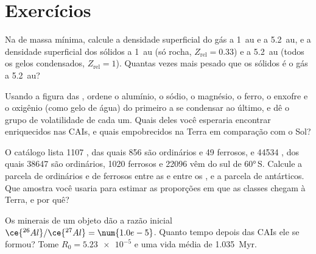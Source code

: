 \section{Exercícios}

\begin{exercise}[$\star$]\label{exo:b2:planet-formation-meteorites:1}
Na  de massa mínima, calcule a densidade superficial do gás a
\qty{1}{au} e a \qty{5.2}{au}, e a densidade superficial dos sólidos a
\qty{1}{au} (só rocha, $Z_{\mathrm{rel}} = 0.33$) e a \qty{5.2}{au} (todos os gelos
condensados, $Z_{\mathrm{rel}} = 1$). Quantas vezes mais pesado que os sólidos é o
gás a \qty{5.2}{au}?
\end{exercise}

\begin{exercise}[$\star$]\label{exo:b2:planet-formation-meteorites:2}
Usando a figura das , ordene o alumínio, o sódio,
o magnésio, o ferro, o enxofre e o oxigênio (como gelo de água) do primeiro a se condensar
ao último, e dê o grupo de volatilidade de cada um. Quais deles você esperaria
encontrar enriquecidos nas CAIs, e quais empobrecidos na Terra em comparação com o Sol?
\end{exercise}

\begin{exercise}[$\star$]\label{exo:b2:planet-formation-meteorites:3}
O catálogo lista \num{1107} , das quais 856 são  ordinários e
49 ferrosos, e \num{44534} , dos quais \num{38647} são  ordinários,
\num{1020} ferrosos e \num{22096} vêm do sul de \ang{60}\,S. Calcule a
parcela de  ordinários e de ferrosos entre as  e entre os ,
e a parcela de  antárticos. Que amostra você usaria para estimar as
proporções em que as classes chegam à Terra, e por quê?
\end{exercise}

\begin{exercise}[$\star$]\label{exo:b2:planet-formation-meteorites:4}
Os minerais de um objeto dão a razão inicial
$\ce{^{26}Al}/\ce{^{27}Al} = \num{1.0e-5}$. Quanto tempo depois das CAIs ele se formou?
Tome $R_0 = \num{5.23e-5}$ e uma vida média de \qty{1.035}{Myr}.
\end{exercise}

